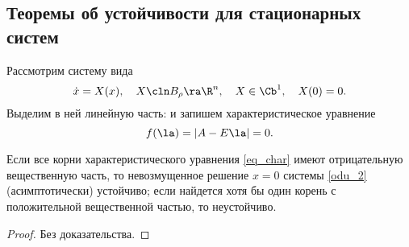 \documentclass[a4paper,12pt]{article}
\newcommand{\eql}[2]{\begin{equation}\label{#2}#1\end{equation}}
\begin{document}
\subsection{Теоремы об устойчивости для стационарных систем}

Рассмотрим систему вида
\eql{\dot{x}=X(x),\quad X\cln B_{\rho}\ra\R^n,\quad X \in \Cb^1,\quad X(0)=0.}{odu_2} Выделим
в ней линейную часть:
 и запишем
характеристическое уравнение \eql{f(\la)=|A-E\la|=0.}{eq_char}
\begin{theorem}[А.\,М.\,Ляпунов]
\label{th_lyap_1}
Если все корни характеристического уравнения \eqref{eq_char} имеют отрицательную вещественную
часть, то невозмущенное решение $x=0$ системы \eqref{odu_2} (асимптотически) устойчиво; если
найдется хотя бы один корень с положительной вещественной частью, то неустойчиво.
\end{theorem}
\begin{proof}
Без доказательства.
\end{proof}
\end{document}
